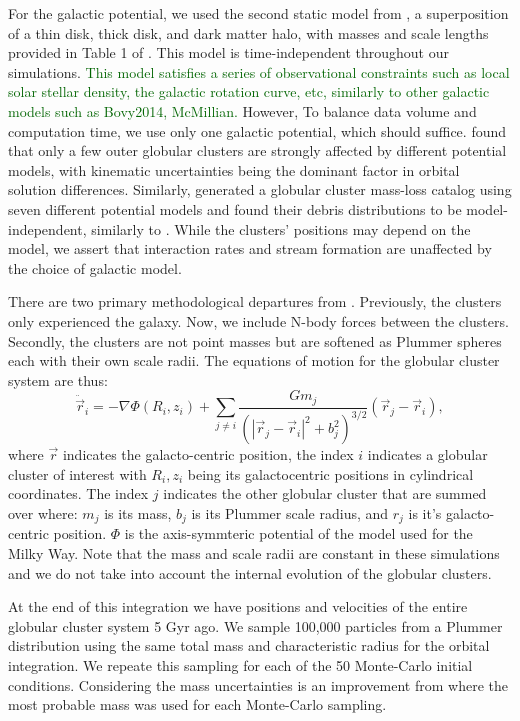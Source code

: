 \documentclass[draft]{aa}
\newcommand{\salvatore}[1]{\textcolor{darkgreen}{{#1}}}
\begin{document}
    For the galactic potential, we used the second static model from \citet{2017A&A...598A..66P}, a superposition of a thin disk, thick disk, and dark matter halo, with masses and scale lengths provided in Table 1 of \citet{2023A&A...673A..44F}. This model is time-independent throughout our simulations. \salvatore{This model satisfies a series of observational constraints such as local solar stellar density, the galactic rotation curve, etc, similarly to other galactic models such as Bovy2014, McMillian.} However, To balance data volume and computation time, we use only one galactic potential, which should suffice. \citet{2021MNRAS.505.5978V} found that only a few outer globular clusters are strongly affected by different potential models, with kinematic uncertainties being the dominant factor in orbital solution differences. Similarly, \citet{2024MNRAS.528.5189G} generated a globular cluster mass-loss catalog using seven different potential models and found their debris distributions to be model-independent, similarly to \citet{2023A&A...673A..44F}. While the clusters' positions may depend on the model, we assert that interaction rates and stream formation are unaffected by the choice of galactic model.    

    There are two primary methodological departures from \citet{2023A&A...673A..44F}. Previously, the clusters only experienced the galaxy. Now, we include N-body forces between the clusters. Secondly, the clusters are not point masses but are softened as Plummer spheres each with their own scale radii. The equations of motion for the globular cluster system are thus: 
    \begin{equation}
      \ddot{\vec{r}}_i = -\nabla \Phi(R_i,z_i) + \left.\sum_{j\neq i} \frac{Gm_j}{\left(|\vec{r}_j - \vec{r}_i|^2 + b_j^2\right)^{3/2}}\right. \left(\vec{r}_j - \vec{r}_i\right),
    \end{equation}\label{eq:GCNBody} where $\vec{r}$ indicates the galacto-centric position, the index $i$ indicates a globular cluster of interest with $R_i,z_i$ being its galactocentric positions in cylindrical coordinates. The index $j$ indicates the other globular cluster that are summed over where: $m_j$ is its mass, $b_j$ is its Plummer scale radius, and $r_j$ is it's galacto-centric position. $\Phi$ is the axis-symmteric potential of the model used for the Milky Way. Note that the mass and scale radii are constant in these simulations and we do not take into account the internal evolution of the globular clusters. 

    At the end of this integration we have positions and velocities of the entire globular cluster system 5 Gyr ago. We sample 100,000 particles from a Plummer distribution using the same total mass and characteristic radius for the orbital integration. We repeate this sampling for each of the 50 Monte-Carlo initial conditions. Considering the mass uncertainties is an improvement from \citet{2023A&A...673A..44F} where the most probable mass was used for each Monte-Carlo sampling. 
\end{document}
